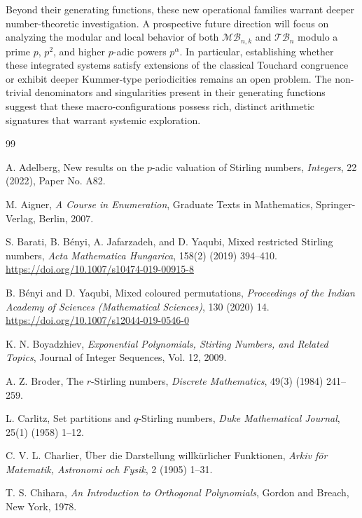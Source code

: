 \documentclass[12pt]{amsart}
\theoremstyle{definition}
\begin{document}
Beyond their generating functions, these new operational families warrant deeper number-theoretic investigation. A prospective future direction will focus on analyzing the modular and local behavior of both $\mathcal{MB}_{n,k}$ and $\mathcal{TB}_n$ modulo a prime $p$, $p^2$, and higher $p$-adic powers $p^\alpha$. In particular, establishing whether these integrated systems satisfy extensions of the classical Touchard congruence or exhibit deeper Kummer-type periodicities remains an open problem. The non-trivial denominators and singularities present in their generating functions suggest that these macro-configurations possess rich, distinct arithmetic signatures that warrant systemic exploration.
\begin{thebibliography}{99}

A. Adelberg,
New results on the $p$-adic valuation of Stirling numbers,
\textit{Integers}, 22 (2022), Paper No. A82.

M. Aigner, 
\textit{A Course in Enumeration}, 
Graduate Texts in Mathematics, Springer-Verlag, Berlin, 2007.

S. Barati, B. Bényi, A. Jafarzadeh, and D. Yaqubi, 
Mixed restricted Stirling numbers, 
\textit{Acta Mathematica Hungarica}, 158(2) (2019) 394--410. 
\url{https://doi.org/10.1007/s10474-019-00915-8}

B. Bényi and D. Yaqubi, 
Mixed coloured permutations, 
\textit{Proceedings of the Indian Academy of Sciences (Mathematical Sciences)}, 130 (2020) 14. 
\url{https://doi.org/10.1007/s12044-019-0546-0}

K. N. Boyadzhiev,
\textit{Exponential Polynomials, Stirling Numbers, and Related Topics},
Journal of Integer Sequences, Vol. 12, 2009.

A. Z. Broder,
The $r$-Stirling numbers,
\textit{Discrete Mathematics}, 49(3) (1984) 241--259.

L. Carlitz,
Set partitions and $q$-Stirling numbers,
\textit{Duke Mathematical Journal}, 25(1) (1958) 1--12.

C. V. L. Charlier, 
Über die Darstellung willkürlicher Funktionen, 
\textit{Arkiv för Matematik, Astronomi och Fysik}, 2 (1905) 1--31.

T. S. Chihara, 
\textit{An Introduction to Orthogonal Polynomials}, 
Gordon and Breach, New York, 1978.


\end{thebibliography}
\end{document}
